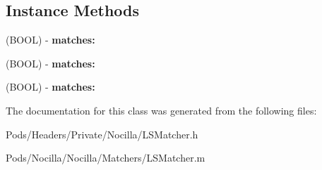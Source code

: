 \subsection*{Instance Methods}
\begin{DoxyCompactItemize}
\item 
\hypertarget{interface_l_s_matcher_ad55f11d5c22fe7ee4b759c50aabe8434}{(B\-O\-O\-L) -\/ {\bfseries matches\-:}}\label{interface_l_s_matcher_ad55f11d5c22fe7ee4b759c50aabe8434}

\item 
\hypertarget{interface_l_s_matcher_ad55f11d5c22fe7ee4b759c50aabe8434}{(B\-O\-O\-L) -\/ {\bfseries matches\-:}}\label{interface_l_s_matcher_ad55f11d5c22fe7ee4b759c50aabe8434}

\item 
\hypertarget{interface_l_s_matcher_ad55f11d5c22fe7ee4b759c50aabe8434}{(B\-O\-O\-L) -\/ {\bfseries matches\-:}}\label{interface_l_s_matcher_ad55f11d5c22fe7ee4b759c50aabe8434}

\end{DoxyCompactItemize}


The documentation for this class was generated from the following files\-:\begin{DoxyCompactItemize}
\item 
Pods/\-Headers/\-Private/\-Nocilla/L\-S\-Matcher.\-h\item 
Pods/\-Nocilla/\-Nocilla/\-Matchers/L\-S\-Matcher.\-m\end{DoxyCompactItemize}
